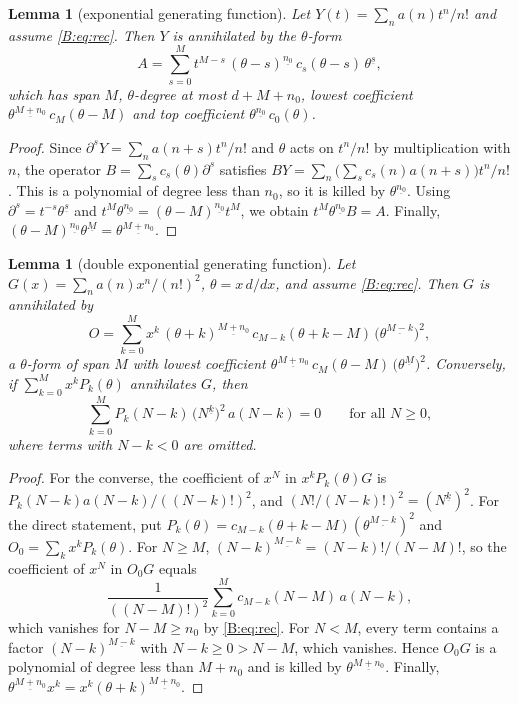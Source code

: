 \documentclass[11pt,a4paper]{article}
\newtheorem{lemma}[theorem]{Lemma}
\theoremstyle{definition}
\theoremstyle{remark}
\newcommand{\ff}[2]{#1^{\underline{#2}}}
\numberwithin{equation}{section}
\begin{document}
\begin{lemma}[exponential generating function]\label{B:lem:dict-egf}
Let $Y(t)=\sum_na(n)t^n/n!$ and assume \eqref{B:eq:rec}. Then $Y$ is annihilated by the $\theta$-form
\[
A=\sum_{s=0}^{M}t^{M-s}\,\ff{(\theta-s)}{n_0}\,c_s(\theta-s)\,\ff{\theta}{s},
\]
which has span $M$, $\theta$-degree at most $d+M+n_0$, lowest coefficient $\ff{\theta}{M+n_0}\,c_M(\theta-M)$ and top coefficient $\ff{\theta}{n_0}\,c_0(\theta)$.
\end{lemma}

\begin{proof}
Since $\partial^sY=\sum_na(n+s)t^n/n!$ and $\theta$ acts on $t^n/n!$ by multiplication with $n$, the operator $B=\sum_sc_s(\theta)\partial^s$ satisfies $BY=\sum_n\bigl(\sum_sc_s(n)a(n+s)\bigr)t^n/n!$. This is a polynomial of degree less than $n_0$, so it is killed by $\ff{\theta}{n_0}$. Using $\partial^s=t^{-s}\ff{\theta}{s}$ and $t^M\ff{\theta}{n_0}=\ff{(\theta-M)}{n_0}t^M$, we obtain $t^M\ff{\theta}{n_0}B=A$. Finally, $\ff{(\theta-M)}{n_0}\ff{\theta}{M}=\ff{\theta}{M+n_0}$.
\end{proof}

\begin{lemma}[double exponential generating function]\label{B:lem:dict-degf}
Let $G(x)=\sum_na(n)x^n/(n!)^2$, $\theta=x\,d/dx$, and assume \eqref{B:eq:rec}. Then $G$ is annihilated by
\[
O=\sum_{k=0}^{M}x^k\,\ff{(\theta+k)}{M+n_0}\,c_{M-k}(\theta+k-M)\,\bigl(\ff{\theta}{M-k}\bigr)^2,
\]
a $\theta$-form of span $M$ with lowest coefficient $\ff{\theta}{M+n_0}\,c_M(\theta-M)\,\bigl(\ff{\theta}{M}\bigr)^2$. Conversely, if $\sum_{k=0}^{M}x^kP_k(\theta)$ annihilates $G$, then
\begin{equation}\label{B:eq:degf-rec}
\sum_{k=0}^{M}P_k(N-k)\,\bigl(\ff{N}{k}\bigr)^2\,a(N-k)=0\qquad\text{for all }N\ge0,
\end{equation}
where terms with $N-k<0$ are omitted.
\end{lemma}

\begin{proof}
For the converse, the coefficient of $x^N$ in $x^kP_k(\theta)G$ is $P_k(N-k)a(N-k)/((N-k)!)^2$, and $(N!/(N-k)!)^2=(\ff{N}{k})^2$. For the direct statement, put $P_k(\theta)=c_{M-k}(\theta+k-M)(\ff{\theta}{M-k})^2$ and $O_0=\sum_kx^kP_k(\theta)$. For $N\ge M$, $\ff{(N-k)}{M-k}=(N-k)!/(N-M)!$, so the coefficient of $x^N$ in $O_0G$ equals
\[
\frac{1}{((N-M)!)^2}\sum_{k=0}^{M}c_{M-k}(N-M)\,a(N-k),
\]
which vanishes for $N-M\ge n_0$ by \eqref{B:eq:rec}. For $N<M$, every term contains a factor $\ff{(N-k)}{M-k}$ with $N-k\ge0>N-M$, which vanishes. Hence $O_0G$ is a polynomial of degree less than $M+n_0$ and is killed by $\ff{\theta}{M+n_0}$. Finally, $\ff{\theta}{M+n_0}x^k=x^k\ff{(\theta+k)}{M+n_0}$.
\end{proof}
\end{document}
